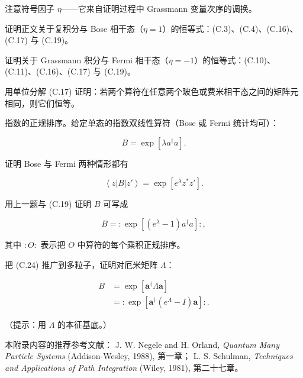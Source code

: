 注意符号因子 $\eta$——它来自证明过程中 Grassmann 变量次序的调换。

\begin{exercises}

\item 证明正文关于复积分与 Bose 相干态（$\eta=1$）的恒等式：(C.3)、(C.4)、(C.16)、(C.17) 与 (C.19)。

\item 证明关于 Grassmann 积分与 Fermi 相干态（$\eta = -1$）的恒等式：(C.10)、(C.11)、(C.16)、(C.17) 与 (C.19)。

\item 用单位分解 (C.17) 证明：若两个算符在任意两个玻色或费米相干态之间的矩阵元相同，则它们恒等。

\item 指数的正规排序。给定单态的指数双线性算符（Bose 或 Fermi 统计均可）：

\begin{equation*}
B = \exp \left[ \lambda a ^ {\dagger} a \right].
\tag{C.22}
\end{equation*}

证明 Bose 与 Fermi 两种情形都有

\begin{equation*}
\left\langle z \left| B \right| z ' \right\rangle = \exp \left[ e ^ {\lambda} z ^ {*} z ' \right].
\tag{C.23}
\end{equation*}

\item 用上一题与 (C.19) 证明 $B$ 可写成

\begin{equation*}
B = : \exp \left[ \left( e ^ {\lambda} - 1 \right) a ^ {\dagger} a \right] : ,
\tag{C.24}
\end{equation*}

其中 $: O :$ 表示把 $O$ 中算符的每个乘积正规排序。

\item 把 (C.24) 推广到多粒子，证明对厄米矩阵 $\Lambda$：

\begin{align*}
B & = \exp \left[ \mathbf {a} ^ {\dagger} \Lambda \mathbf {a} \right]\\
& = : \exp \left[ \mathbf {a} ^ {\dagger} \left( e ^ {\Lambda} - I \right) \mathbf {a} \right] : .
\tag{C.25}
\end{align*}

（提示：用 $\Lambda$ 的本征基底。）

\end{exercises}

\begin{chapbib}
\item 本附录内容的推荐参考文献：
  J. W. Negele and H. Orland, \textit{Quantum Many Particle Systems} (Addison-Wesley, 1988), 第一章；
  L. S. Schulman, \textit{Techniques and Applications of Path Integration} (Wiley, 1981), 第二十七章。
\end{chapbib}
